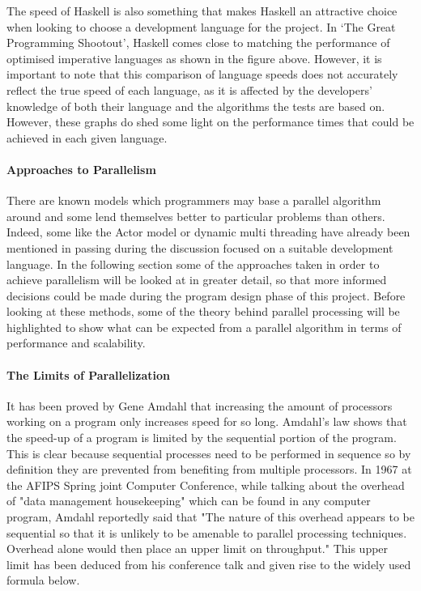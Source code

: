 \documentclass[main.tex]{subfiles}
\begin{document}
{{%

The speed of Haskell is also something that makes Haskell an attractive choice when looking to choose a development language for the project. In `The Great Programming Shootout', Haskell comes close to matching the performance of optimised imperative languages as shown in the figure above. However, it is important to note that this comparison of language speeds does not accurately reflect the true speed of each language, as it is affected by the developers' knowledge of both their language and the algorithms the tests are based on. However, these graphs do shed some light on the performance times that could be achieved in each given language.

\paragraph{Approaches to Parallelism}There are known models which programmers may base a parallel algorithm around and some lend themselves better to particular problems than others. Indeed, some like the Actor model or dynamic multi threading have already been mentioned in passing during the discussion focused on a suitable development language. In the following section some of the approaches taken in order to achieve parallelism will be looked at in greater detail, so that more informed decisions could be made during the program design phase of this project. Before looking at these methods, some of the theory behind parallel processing will be highlighted to show what can be expected from a parallel algorithm in terms of performance and scalability.

\paragraph{The Limits of Parallelization}It has been proved by Gene Amdahl that increasing the amount of processors working on a program only increases speed for so long. Amdahl's law shows that the speed-up of a program is limited by the sequential portion of the program. This is clear because sequential processes need to be performed in sequence so by definition they are prevented from benefiting from multiple processors. In 1967 at the AFIPS Spring joint Computer Conference, while talking about the overhead of "data management housekeeping" which can be found in any computer program, Amdahl reportedly said that "The nature of this overhead appears to be sequential so that it is unlikely to be amenable to parallel processing techniques. Overhead alone would then place an upper limit on throughput."\cite{Amdahl1967} This upper limit has been deduced from his conference talk and given rise to the widely used formula below.

}}
\end{document}
